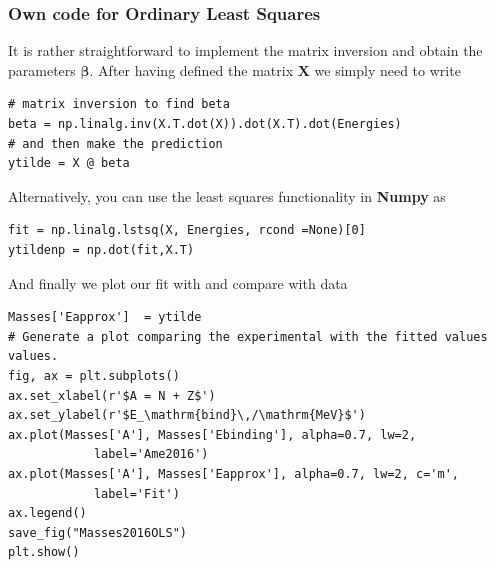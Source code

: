 \documentclass{beamer}
\begin{document}
\begin{frame}
\frametitle{Own code for Ordinary Least Squares}

It is rather straightforward to implement the matrix inversion and obtain the parameters $\bm{\beta}$. After having defined the matrix $\bm{X}$ we simply need to 
write





\begin{verbatim}
# matrix inversion to find beta
beta = np.linalg.inv(X.T.dot(X)).dot(X.T).dot(Energies)
# and then make the prediction
ytilde = X @ beta

\end{verbatim}

Alternatively, you can use the least squares functionality in \textbf{Numpy} as



\begin{verbatim}
fit = np.linalg.lstsq(X, Energies, rcond =None)[0]
ytildenp = np.dot(fit,X.T)

\end{verbatim}


And finally we plot our fit with and compare with data













\begin{verbatim}
Masses['Eapprox']  = ytilde
# Generate a plot comparing the experimental with the fitted values values.
fig, ax = plt.subplots()
ax.set_xlabel(r'$A = N + Z$')
ax.set_ylabel(r'$E_\mathrm{bind}\,/\mathrm{MeV}$')
ax.plot(Masses['A'], Masses['Ebinding'], alpha=0.7, lw=2,
            label='Ame2016')
ax.plot(Masses['A'], Masses['Eapprox'], alpha=0.7, lw=2, c='m',
            label='Fit')
ax.legend()
save_fig("Masses2016OLS")
plt.show()

\end{verbatim}
\end{frame}
\end{document}
